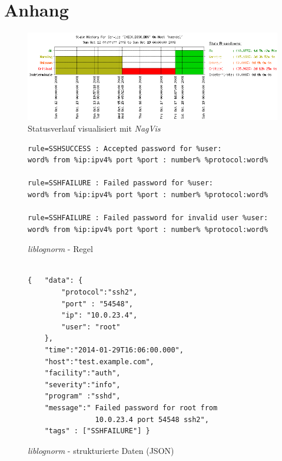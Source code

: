 \chapter*{Anhang}\label{appendix}
\setcounter{chapter}{5}
\thispagestyle{fancy}
\vspace{1cm}
\begin{figure}[htbp]
    \caption{Statusverlauf visualisiert mit \textit{NagVis}}
    \label{app:nag}\vspace{0.2cm}
    \centering
    \includegraphics[scale=0.6]{img/nag_trend}  
\end{figure}

\vspace{4cm}
\begin{figure}[h]
    \caption{\textit{liblognorm} - Regel}
    \label{app:liblognorm-rule}\vspace{0.2cm}
    \centering
\begin{minipage}{0.8\textwidth}
\begin{verbatim}
rule=SSHSUCCESS : Accepted password for %user:
word% from %ip:ipv4% port %port : number% %protocol:word%

rule=SSHFAILURE : Failed password for %user:
word% from %ip:ipv4% port %port : number% %protocol:word%

rule=SSHFAILURE : Failed password for invalid user %user:
word% from %ip:ipv4% port %port : number% %protocol:word%

\end{verbatim}
\end{minipage}
\end{figure}


\begin{figure}[h]
    \caption{\textit{liblognorm} - strukturierte Daten (JSON)}
    \label{app:liblognorm-normalisation}\vspace{0.2cm}
    \centering
    \begin{minipage}{0.8\textwidth}
\begin{verbatim}
        
{   "data": {
        "protocol":"ssh2",
        "port" : "54548",
        "ip": "10.0.23.4",
        "user": "root"
    },
    "time":"2014-01-29T16:06:00.000",
    "host":"test.example.com",
    "facility":"auth",
    "severity":"info",
    "program" :"sshd",
    "message":" Failed password for root from
                10.0.23.4 port 54548 ssh2",
    "tags" : ["SSHFAILURE"] }
\end{verbatim}
\end{minipage}
\end{figure}


